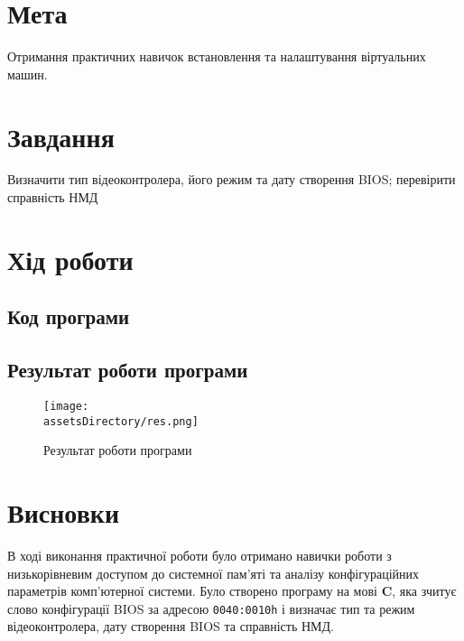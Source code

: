 \section{Мета}
Отримання практичних навичок встановлення та
налаштування віртуальних машин.


\section{Завдання}
Визначити тип відеоконтролера, його режим та дату створення BIOS;
перевірити справність НМД


\section{Хід роботи}
\subsection{Код програми}


\subsection{Результат роботи програми}
\begin{figure}[ht!]
    \centering
    \texttt{[image: \\assetsDirectory/res.png]}
    \caption{Результат роботи програми}
\end{figure}

\clearpage
\section{Висновки}
В ході виконання практичної роботи було отримано навички роботи з
низькорівневим доступом до системної пам'яті та аналізу конфігураційних параметрів комп'ютерної системи.
Було створено програму на мові \textbf{C}, яка зчитує слово конфігурації BIOS за адресою \texttt{0040:0010h}
і визначає тип та режим відеоконтролера, дату створення BIOS та справність НМД.
